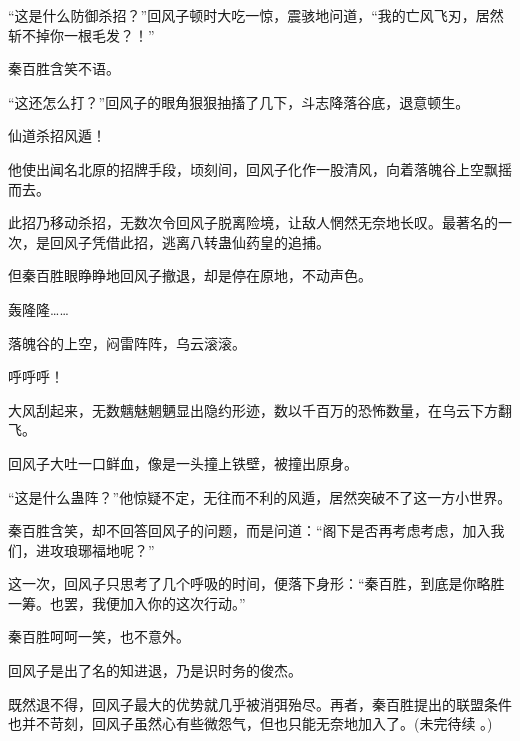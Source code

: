 \begin{this_body}
“这是什么防御杀招？”回风子顿时大吃一惊，震骇地问道，“我的亡风飞刃，居然斩不掉你一根毛发？！”

秦百胜含笑不语。

“这还怎么打？”回风子的眼角狠狠抽搐了几下，斗志降落谷底，退意顿生。

仙道杀招风遁！

他使出闻名北原的招牌手段，顷刻间，回风子化作一股清风，向着落魄谷上空飘摇而去。

此招乃移动杀招，无数次令回风子脱离险境，让敌人惘然无奈地长叹。最著名的一次，是回风子凭借此招，逃离八转蛊仙药皇的追捕。

但秦百胜眼睁睁地回风子撤退，却是停在原地，不动声色。

轰隆隆……

落魄谷的上空，闷雷阵阵，乌云滚滚。

呼呼呼！

大风刮起来，无数魑魅魍魉显出隐约形迹，数以千百万的恐怖数量，在乌云下方翻飞。

回风子大吐一口鲜血，像是一头撞上铁壁，被撞出原身。

“这是什么蛊阵？”他惊疑不定，无往而不利的风遁，居然突破不了这一方小世界。

秦百胜含笑，却不回答回风子的问题，而是问道：“阁下是否再考虑考虑，加入我们，进攻琅琊福地呢？”

这一次，回风子只思考了几个呼吸的时间，便落下身形：“秦百胜，到底是你略胜一筹。也罢，我便加入你的这次行动。”

秦百胜呵呵一笑，也不意外。

回风子是出了名的知进退，乃是识时务的俊杰。

既然退不得，回风子最大的优势就几乎被消弭殆尽。再者，秦百胜提出的联盟条件也并不苛刻，回风子虽然心有些微怨气，但也只能无奈地加入了。(未完待续 。)

\end{this_body}

